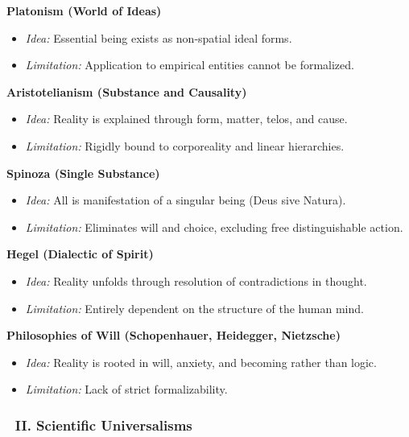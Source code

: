 \documentclass[12pt]{article}
\begin{document}
\textbf{Platonism (World of Ideas)}

\begin{itemize}
\item \textit{Idea:} Essential being exists as non-spatial ideal forms.
\item \textit{Limitation:} Application to empirical entities cannot be formalized.
\end{itemize}

\textbf{Aristotelianism (Substance and Causality)}

\begin{itemize}
\item \textit{Idea:} Reality is explained through form, matter, telos, and cause.
\item \textit{Limitation:} Rigidly bound to corporeality and linear hierarchies.
\end{itemize}

\textbf{Spinoza (Single Substance)}

\begin{itemize}
\item \textit{Idea:} All is manifestation of a singular being (Deus sive Natura).
\item \textit{Limitation:} Eliminates will and choice, excluding free distinguishable action.
\end{itemize}

\textbf{Hegel (Dialectic of Spirit)}

\begin{itemize}
\item \textit{Idea:} Reality unfolds through resolution of contradictions in thought.
\item \textit{Limitation:} Entirely dependent on the structure of the human mind.
\end{itemize}

\textbf{Philosophies of Will (Schopenhauer, Heidegger, Nietzsche)}

\begin{itemize}
\item \textit{Idea:} Reality is rooted in will, anxiety, and becoming rather than logic.
\item \textit{Limitation:} Lack of strict formalizability.
\end{itemize}

\subsubsection*{🔹 II. Scientific Universalisms}
\end{document}
